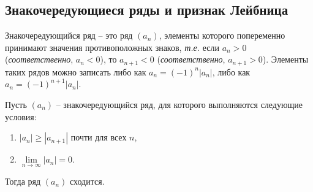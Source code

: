 \subsection{Знакочередующиеся ряды и признак Лейбница}

\begin{definition}
    Знакочередующийся ряд -- это ряд $(a_n)$, элементы которого попеременно принимают значения противоположных знаков, \textit{т.е.} если $a_n>0$ (\textit{соответственно}, $a_n <0$), то $a_{n+1}<0$ (\textit{соответственно}, $a_{n+1}>0$). Элементы таких рядов можно записать либо как $a_n  = (-1)^n |a_n|$, либо как $a_n = (-1)^{n+1}|a_n|$.
\end{definition}



\begin{theorem}\label{Leibnitz_for_series}
   Пусть $(a_n)$ -- знакочередующийся ряд, для которого выполняются следующие условия:
   \begin{enumerate}
       \item $|a_n| \ge |a_{n+1}|$ почти для всех $n$,
       \item $\lim\limits_{n \to \infty} |a_n| = 0$.
   \end{enumerate}
   Тогда ряд $(a_n)$ сходится.
\end{theorem}

